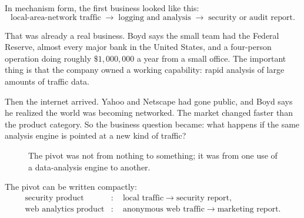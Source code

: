 In mechanism form, the first business looked like this:
\begin{equation}
\text{local-area-network traffic}
\;\longrightarrow\;
\text{logging and analysis}
\;\longrightarrow\;
\text{security or audit report}.
\end{equation}

That was already a real business. Boyd says the small team had the Federal Reserve, almost every major bank in the United States, and a four-person operation doing roughly \(\$1{,}000{,}000\) a year from a small office. The important thing is that the company owned a working capability: rapid analysis of large amounts of traffic data.

Then the internet arrived. Yahoo and Netscape had gone public, and Boyd says he realized the world was becoming networked. The market changed faster than the product category. So the business question became: what happens if the same analysis engine is pointed at a new kind of traffic?

\begin{figure}
\centering
{}
\caption{The pivot was not from nothing to something; it was from one use of a data-analysis engine to another.}
\end{figure}

The pivot can be written compactly:
\begin{align}
\text{security product}
&:\quad
\text{local traffic} \longrightarrow \text{security report},\\
\text{web analytics product}
&:\quad
\text{anonymous web traffic} \longrightarrow \text{marketing report}.
\end{align}

